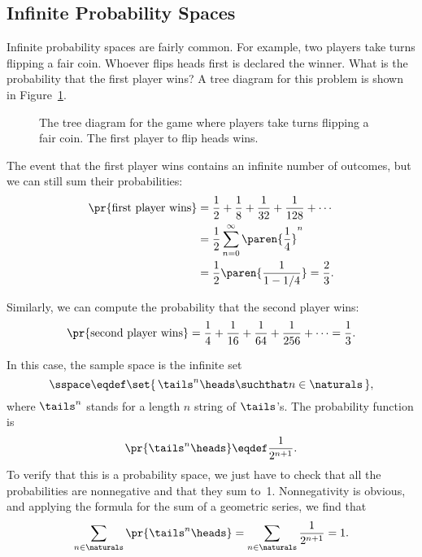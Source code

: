 \subsection{Infinite Probability Spaces}

\iffalse
General probability theory deals with uncountable sets like~$\reals$,
but in computer science, it is usually sufficient to restrict our
attention to countable probability spaces.  It's also a lot
easier---infinite sample spaces are hard enough to work with without
having to deal with uncountable spaces.
\fi

Infinite probability spaces are fairly common.  For example, two
players take turns flipping a fair coin.  Whoever flips heads first is
declared the winner.  What is the probability that the first player
wins?  A tree diagram for this problem is shown in
Figure~\ref{fig:14A15}.

\begin{figure}


\caption{The tree diagram for the game where players take turns
  flipping a fair coin.  The first player to flip heads wins.}

\label{fig:14A15}

\end{figure}

The event that the first player wins contains an infinite number of
outcomes, but we can still sum their probabilities:
\begin{align*}
\pr{\text{first player wins}}
    & = \frac{1}{2} + \frac{1}{8} + \frac{1}{32} + \frac{1}{128} + \cdots \\
    & = \frac{1}{2} \sum_{n=0}^\infty \paren{\frac{1}{4}}^n \\
    & = \frac{1}{2}\paren{\frac{1}{1-1/4}} = \frac{2}{3}.
\end{align*}

Similarly, we can compute the probability that the second player wins:
\begin{align*}
\pr{\text{second player wins}}
     = \frac{1}{4} + \frac{1}{16} + \frac{1}{64} + \frac{1}{256}
                      + \cdots %
     = \frac{1}{3}.
\end{align*}

In this case, the sample space is the infinite set
\[
    \sspace \eqdef \set{\, \tails^n\heads \suchthat n \in \naturals \,},
\]
where $\tails^n$ stands for a length $n$ string of $\tails$'s.
The probability function is
\[
\pr{\tails^n\heads} \eqdef \frac{1}{2^{n+1}}.
\]
To verify that this is a probability space, we just have to check that
all the probabilities are nonnegative and that they sum to~1.
Nonnegativity is obvious, and applying the formula for the sum of a
geometric series, we find that
\begin{equation*}
\sum_{n \in \naturals} \pr{\tails^n\heads}
    = \sum_{n \in \naturals} \frac{1}{2^{n+1}} \\
    = 1.
\end{equation*}

